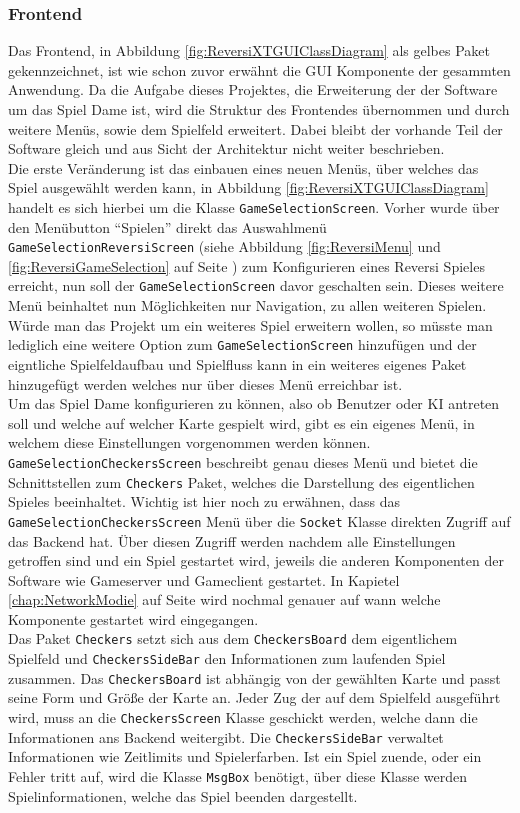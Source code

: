 \documentclass[12pt,a4paper,bibliography=totocnumbered,listof=totocnumbered]{article}
\begin{document}
\subsubsection{Frontend}
Das Frontend, in Abbildung \ref{fig:ReversiXTGUIClassDiagram} als gelbes Paket gekennzeichnet, ist wie schon zuvor erwähnt die
GUI Komponente der gesammten Anwendung. Da die Aufgabe dieses Projektes, die Erweiterung der der Software um das Spiel Dame ist, 
wird die Struktur des Frontendes übernommen und durch weitere Menüs, sowie dem Spielfeld erweitert. Dabei bleibt der vorhande Teil der Software gleich 
und aus Sicht der Architektur nicht weiter beschrieben. 
\\
Die erste Veränderung ist das einbauen eines neuen Menüs, über welches das Spiel ausgewählt werden kann, in Abbildung \ref{fig:ReversiXTGUIClassDiagram} 
handelt es sich hierbei um die Klasse \texttt{GameSelectionScreen}. Vorher wurde über den Menübutton ``Spielen'' direkt das Auswahlmenü \texttt{GameSelectionReversiScreen}
(siehe Abbildung \ref{fig:ReversiMenu} und \ref{fig:ReversiGameSelection} auf Seite \pageref{fig:ReversiMenu}) zum Konfigurieren eines Reversi Spieles erreicht, 
nun soll der \texttt{GameSelectionScreen} davor geschalten sein. Dieses weitere Menü beinhaltet nun Möglichkeiten nur Navigation, zu allen weiteren Spielen.
Würde man das Projekt um ein weiteres Spiel erweitern wollen, so müsste man lediglich eine weitere Option zum \texttt{GameSelectionScreen} hinzufügen 
und der eigntliche Spielfeldaufbau und Spielfluss kann in ein weiteres eigenes Paket hinzugefügt werden welches nur über dieses Menü erreichbar ist.
\\
Um das Spiel Dame konfigurieren zu können, also ob Benutzer oder KI antreten soll und welche auf welcher Karte gespielt wird, gibt es ein eigenes Menü, 
in welchem diese Einstellungen vorgenommen werden können. \texttt{GameSelectionCheckersScreen} beschreibt genau dieses Menü und bietet die Schnittstellen 
zum \texttt{Checkers} Paket, welches die Darstellung des eigentlichen Spieles beeinhaltet. Wichtig ist hier noch zu erwähnen, dass das \texttt{GameSelectionCheckersScreen}
Menü über die \texttt{Socket} Klasse direkten Zugriff auf das Backend hat. Über diesen Zugriff werden nachdem alle Einstellungen getroffen sind und ein Spiel
gestartet wird, jeweils die anderen Komponenten der Software wie Gameserver und Gameclient gestartet. In Kapietel \ref{chap:NetworkModie} auf Seite \pageref{chap:NetworkModie} 
wird nochmal genauer auf wann welche Komponente gestartet wird eingegangen.
\\
Das Paket \texttt{Checkers} setzt sich aus dem \texttt{CheckersBoard} dem eigentlichem Spielfeld und \texttt{CheckersSideBar} den Informationen zum laufenden Spiel zusammen. 
Das \texttt{CheckersBoard} ist abhängig von der gewählten Karte und passt seine Form und Größe der Karte an. Jeder Zug der auf dem Spielfeld ausgeführt wird, muss an 
die \texttt{CheckersScreen} Klasse geschickt werden, welche dann die Informationen ans Backend weitergibt.
Die \texttt{CheckersSideBar} verwaltet Informationen wie Zeitlimits und Spielerfarben. 
Ist ein Spiel zuende, oder ein Fehler tritt auf, wird die Klasse \texttt{MsgBox} benötigt, über diese Klasse werden Spielinformationen, welche das Spiel beenden 
dargestellt.
\end{document}
